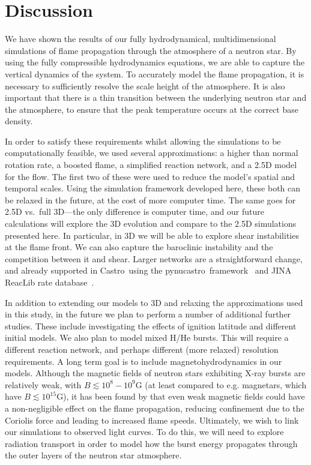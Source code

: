 \documentclass[preprint,times,tighten]{aastex63}
\newcommand{\castro}{{\sf Castro}}
\newcommand{\pynucastro}{{\sf pynucastro}}
\newcommand{\MarginPar}[1]{
    \marginpar{\vskip-\baselineskip%
               \raggedright%
               \tiny\sffamily%
               {\color{red}\hrule%
               \smallskip%
               #1\par%
               \smallskip%
               \hrule}}%
}
\begin{document}
\section{Discussion}

We have shown the results of our fully hydrodynamical, multidimensional simulations of flame propagation through the atmosphere of a neutron star. By using the fully compressible hydrodynamics equations, we are able to capture the vertical dynamics of the system. To accurately model the flame propagation, it is necessary to sufficiently resolve the scale height of the atmosphere. It is also important that there is a thin transition between the underlying neutron star and the atmosphere, to ensure that the peak temperature occurs at the correct base density. 

In order to satisfy these requirements whilst allowing the simulations to be computationally feasible, we used several approximations: a higher than normal rotation rate, a boosted flame, a simplified reaction network, and a 2.5D model for the flow. The first two of these were used to reduce the model's spatial and temporal scales. Using the simulation framework developed here, these both can be relaxed in the future, at the cost of more computer time. The same goes for 2.5D
vs.\ full 3D---the only difference is computer time, and our future
calculations will explore the 3D evolution and compare to the 2.5D simulations presented here. In particular,
in 3D we will be able to explore shear instabilities at the flame front.  We can also capture the 
baroclinic instability \citep{Cavecchi2019} and the competition between it and shear.
Larger networks are a straightforward change, and already supported in
\castro\ using the \pynucastro\ framework~\citep{pynucastro} and JINA
ReacLib rate database~\citep{reaclib}. 

\MarginPar{Relate our work to previous work}

In addition to extending our models to 3D and relaxing the approximations used in 
this study, in the future we plan to perform a number of additional further studies. 
These include investigating the effects of ignition latitude and different initial 
models. We also plan to model mixed H/He bursts. This will require a
different reaction network, and perhaps different (more relaxed)
resolution requirements. A long term goal is to include magnetohydrodynamics in our 
models. Although the magnetic fields of neutron stars exhibiting X-ray bursts are 
relatively weak, with $B \lesssim 10^8 - 10^9$G \citep{mukherjee2015magnetic} (at
 least compared to e.g. magnetars, which have $B\lesssim 10^{15}$G), it has been 
 found by \citet{art-2016-cavecchi-etal} that even weak magnetic fields could have 
 a non-negligible effect on the flame propagation, reducing confinement due to the 
 Coriolis force and leading to increased flame speeds. Ultimately, we wish to link 
 our simulations to observed light curves. To do this, we will need to explore 
 radiation transport in order to model how the burst energy propagates through the 
 outer layers of the neutron star atmosphere. 
\end{document}
